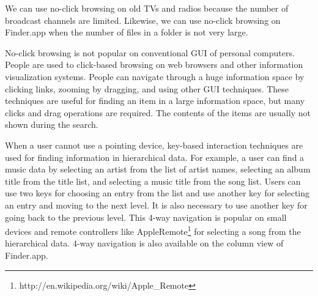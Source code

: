 \documentclass[conference]{IEEEtran}
\begin{document}
We can use no-click browsing on old TVs and radios because the number of
broadcast channels are limited.
Likewise, we can use no-click browsing on Finder.app when the number of files
in a folder is not very large.

No-click browsing is not popular on conventional GUI of personal computers.
People are used to click-based browsing on web browsers and other
information visualization systems.
People can navigate through a huge information space by
clicking links, zooming by dragging, and using other GUI techniques.
These techniques are useful for finding an item in a large information space,
but many clicks and drag operations are required.
The contents of the items are usually not shown during the search.

% 



When a user cannot use a pointing device,
key-based interaction techniques are used for
finding information in hierarchical data.
%
For example, a user can find a music data by
selecting an artist from the list of artist names,
selecting an album title from the title list,
and selecting a music title from the song list.
%
Users can use two keys for choosing an entry from the list
and use another key for selecting an entry and moving to the next level.
It is also necessary to use another key for going back to the previous level.
This 4-way navigation is popular on small devices
and remote controllers like AppleRemote\footnote{\textsf{http://en.wikipedia.org/wiki/Apple\_Remote}}
for selecting a song from the hierarchical data.
4-way navigation is also available on the column view of Finder.app.
\end{document}
